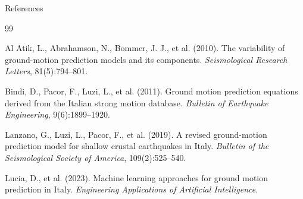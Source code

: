 \documentclass[aspectratio=169,11pt]{beamer}
\begin{document}
\appendix

\begin{frame}[allowframebreaks]{References}
\small
\begin{thebibliography}{99}

Al Atik, L., Abrahamson, N., Bommer, J. J., et al. (2010).
The variability of ground-motion prediction models and its components.
\textit{Seismological Research Letters}, 81(5):794--801.

Bindi, D., Pacor, F., Luzi, L., et al. (2011).
Ground motion prediction equations derived from the Italian strong motion database.
\textit{Bulletin of Earthquake Engineering}, 9(6):1899--1920.

Lanzano, G., Luzi, L., Pacor, F., et al. (2019).
A revised ground-motion prediction model for shallow crustal earthquakes in Italy.
\textit{Bulletin of the Seismological Society of America}, 109(2):525--540.

Lucia, D., et al. (2023).
Machine learning approaches for ground motion prediction in Italy.
\textit{Engineering Applications of Artificial Intelligence}.

\end{thebibliography}
\end{frame}
\end{document}
